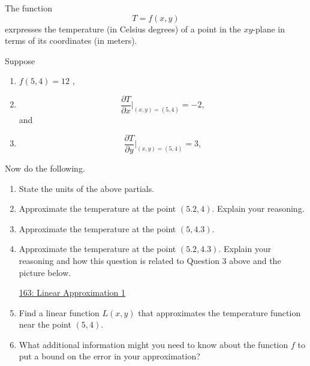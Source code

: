 \documentclass{ximera}
\begin{document}
\begin{question} \label{Q9e8f3rg}
The function
\[
   T = f(x,y)
\]
exrpresses the temperature (in Celsius degrees) of a point in the $xy$-plane in terms of its coordinates (in meters).

Suppose
\begin{enumerate}
\item $f(5,4) = 12$ ,

\item 
\[
      \frac{\partial T}{\partial x}\Big|_{(x,y) = (5,4)} = -2, 
\]
and
\item 
\[
      \frac{\partial T}{\partial y}\Big|_{(x,y) = (5,4)} = 3, 
\]

\end{enumerate}

Now do the following.

\begin{enumerate}

\item State the units of the above partials.

\item Approximate the temperature at the point $(5.2, 4)$. Explain your reasoning.

\item Approximate the temperature at the point $(5, 4.3)$. 

\item Approximate the temperature at the point $(5.2, 4.3)$. Explain your reasoning and how this question is related to Question 3  above and the picture below.

\begin{onlineOnly}
    \begin{center}
\end{center}
\end{onlineOnly}

\href{https://www.desmos.com/3d/et3nquim6f}{163: Linear Approximation 1}


\item Find a linear function $L(x,y)$ that approximates the temperature function near the point $(5,4)$.

\item What additional information might you need to know about the function $f$ to put a bound on the error in your approximation?

\end{enumerate}
\end{question}
\end{document}
